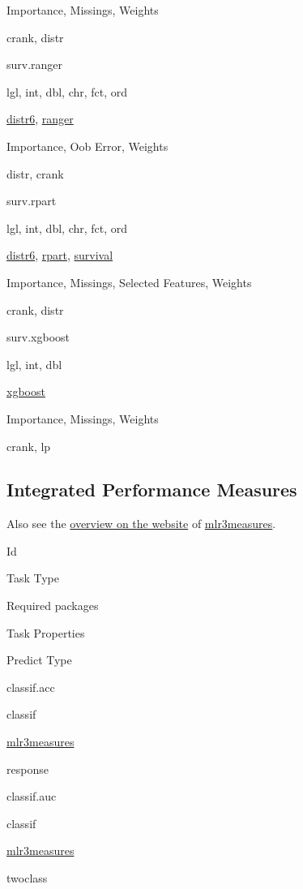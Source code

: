 \documentclass[]{article}
\begin{document}
Importance, Missings, Weights

crank, distr

surv.ranger

lgl, int, dbl, chr, fct, ord

\href{https://cran.r-project.org/package=distr6}{distr6}, \href{https://cran.r-project.org/package=ranger}{ranger}

Importance, Oob Error, Weights

distr, crank

surv.rpart

lgl, int, dbl, chr, fct, ord

\href{https://cran.r-project.org/package=distr6}{distr6}, \href{https://cran.r-project.org/package=rpart}{rpart}, \href{https://cran.r-project.org/package=survival}{survival}

Importance, Missings, Selected Features, Weights

crank, distr

surv.xgboost

lgl, int, dbl

\href{https://cran.r-project.org/package=xgboost}{xgboost}

Importance, Missings, Weights

crank, lp

\hypertarget{list-measures}{%
\subsection{Integrated Performance Measures}\label{list-measures}}

Also see the \href{https://mlr3measures.mlr-org.com/reference/}{overview on the website} of \href{https://cran.r-project.org/package=mlr3measures}{mlr3measures}.

Id

Task Type

Required packages

Task Properties

Predict Type

classif.acc

classif

\href{https://cran.r-project.org/package=mlr3measures}{mlr3measures}

response

classif.auc

classif

\href{https://cran.r-project.org/package=mlr3measures}{mlr3measures}

twoclass
\end{document}
